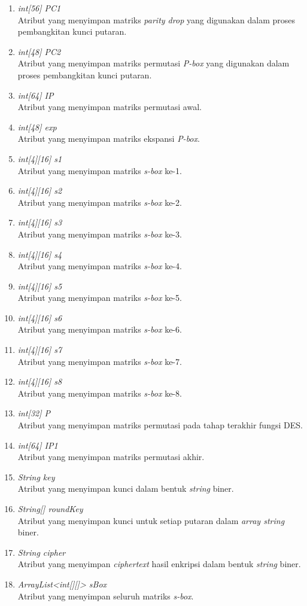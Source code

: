 \begin{enumerate}
	\item \textit{int[56] PC1} \\
	Atribut yang menyimpan matriks \textit{parity drop} yang digunakan dalam proses pembangkitan kunci putaran.
	\item \textit{int[48] PC2} \\
	Atribut yang menyimpan matriks permutasi \textit{P-box} yang digunakan dalam proses pembangkitan kunci putaran.
	\item \textit{int[64] IP} \\
	Atribut yang menyimpan matriks permutasi awal.
	\item \textit{int[48] exp} \\
	Atribut yang menyimpan matriks ekspansi \textit{P-box}.
	\item \textit{int[4][16] s1} \\
	Atribut yang menyimpan matriks \textit{s-box} ke-1.
	\item \textit{int[4][16] s2} \\
	Atribut yang menyimpan matriks \textit{s-box} ke-2.
	\item \textit{int[4][16] s3} \\
	Atribut yang menyimpan matriks \textit{s-box} ke-3.
	\item \textit{int[4][16] s4} \\
	Atribut yang menyimpan matriks \textit{s-box} ke-4.
	\item \textit{int[4][16] s5} \\
	Atribut yang menyimpan matriks \textit{s-box} ke-5.
	\item \textit{int[4][16] s6} \\
	Atribut yang menyimpan matriks \textit{s-box} ke-6.
	\item \textit{int[4][16] s7} \\
	Atribut yang menyimpan matriks \textit{s-box} ke-7.
	\item \textit{int[4][16] s8} \\
	Atribut yang menyimpan matriks \textit{s-box} ke-8.
	\item \textit{int[32] P} \\
	Atribut yang menyimpan matriks permutasi pada tahap terakhir fungsi DES.
	\item \textit{int[64] IP1} \\
	Atribut yang menyimpan matriks permutasi akhir.
	\item \textit{String key} \\
	Atribut yang menyimpan kunci dalam bentuk \textit{string} biner.
	\item \textit{String[] roundKey} \\
	Atribut yang menyimpan kunci untuk setiap putaran dalam \textit{array string} biner.
	\item \textit{String cipher} \\
	Atribut yang menyimpan \textit{ciphertext} hasil enkripsi dalam bentuk \textit{string} biner.
	\item \textit{ArrayList<int[][]> sBox} \\
	Atribut yang menyimpan seluruh matriks \textit{s-box}.
\end{enumerate}

